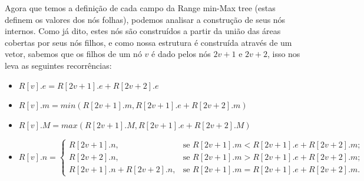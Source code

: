     Agora que temos a definição de cada campo da Range min-Max tree (estas definem os valores dos nós folhas), podemos analisar a construção de seus nós internos. Como já dito, estes nós são construídos  a partir da união das áreas cobertas por seus nós filhos, e como nossa estrutura é construída através de um vetor, sabemos que os filhos de um nó $v$ é dado pelos nós $2v+1$ e $2v + 2$, isso nos leva as seguintes recorrências:
    \begin{itemize}
        \item $R[v].e = R[2v +1 ].e + R[2v + 2].e$
        \item $R[v].m = min(R[2v+1].m, R[2v+1].e + R[2v + 2].m)$
        \item $R[v].M = max(R[2v+1].M, R[2v+1].e + R[2v + 2].M)$
        \item $ R[v].n =
           \begin{cases}
                 R[2v+1].n, & \mbox{se } R[2v+1].m < R[2v+1].e + R[2v + 2].m; \\
                 R[2v + 2].n, & \mbox{se } R[2v+1].m > R[2v+1].e + R[2v + 2].m; \\
                 R[2v+1].n + R[2v + 2].n, & \mbox{se }  R[2v+1].m = R[2v+1].e + R[2v + 2].m .
           \end{cases}
        $
    \end{itemize}
